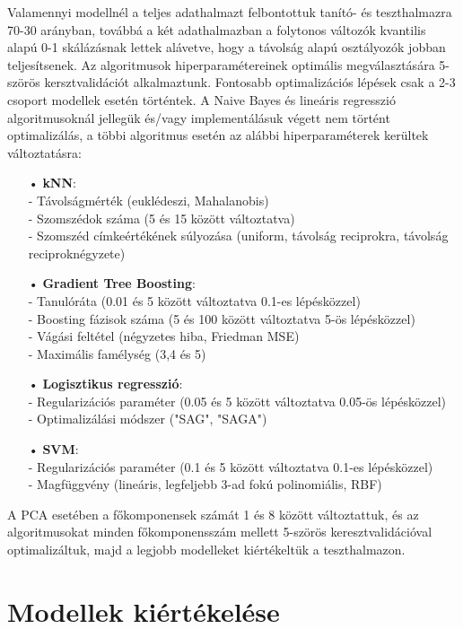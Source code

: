 \documentclass[12pt]{article}
\begin{document}
Valamennyi modellnél a teljes adathalmazt felbontottuk tanító- és teszthalmazra 70-30 arányban, továbbá a két adathalmazban a folytonos változók kvantilis alapú 0-1 skálázásnak lettek alávetve, hogy a távolság alapú osztályozók jobban teljesítsenek. Az algoritmusok hiperparamétereinek optimális megválasztására 5-szörös kersztvalidációt alkalmaztunk.  Fontosabb optimalizációs lépések csak a 2-3 csoport modellek esetén történtek. A Naive Bayes és lineáris regresszió algoritmusoknál jellegük és/vagy implementálásuk végett nem történt optimalizálás, a többi algoritmus esetén az alábbi hiperparaméterek kerültek változtatásra:
\begin{itemize}
\item[•] \textbf{kNN}: \\
- Távolságmérték (euklédeszi, Mahalanobis) \\
- Szomszédok száma (5 és 15 között változtatva) \\
- Szomszéd címkeértékének súlyozása (uniform, távolság reciprokra, távolság reciproknégyzete) 
\item[•] \textbf{Gradient Tree Boosting}: \\
- Tanulóráta (0.01 és 5 között változtatva 0.1-es lépésközzel)\\
- Boosting fázisok száma (5 és 100 között változtatva 5-ös lépésközzel)\\
- Vágási feltétel (négyzetes hiba, Friedman MSE) \\
- Maximális famélység (3,4 és 5)
\item[•] \textbf{Logisztikus regresszió}: \\
- Regularizációs paraméter (0.05 és 5 között változtatva 0.05-ös lépésközzel) \\
- Optimalizálási módszer ("SAG", "SAGA") 
\item[•] \textbf{SVM}: \\
- Regularizációs paraméter (0.1 és 5 között változtatva 0.1-es lépésközzel)\\
- Magfüggvény (lineáris, legfeljebb 3-ad fokú polinomiális, RBF)
\end{itemize}A PCA esetében a főkomponensek számát 1 és 8 között változtattuk, és az algoritmusokat minden főkomponensszám mellett 5-szörös keresztvalidációval optimalizáltuk, majd a legjobb modelleket kiértékeltük a teszthalmazon.



\section{Modellek kiértékelése}




\begin{thebibliography}{9}
\end{thebibliography}
\end{document}
